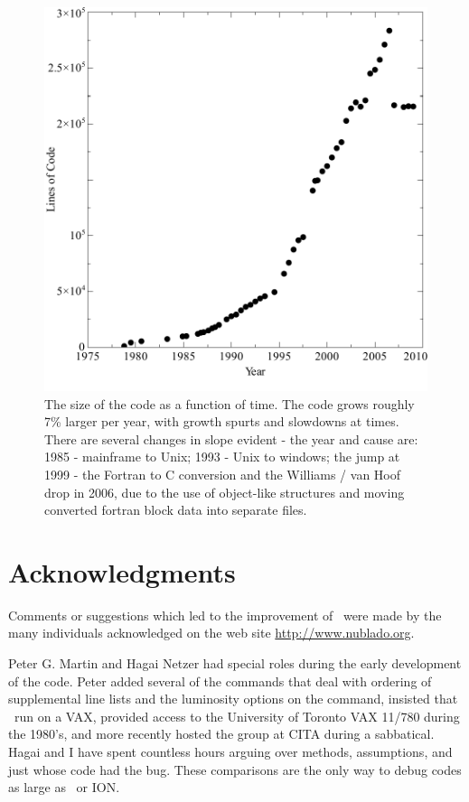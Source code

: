 \begin{figure}
\centering
\includegraphics{size}
\caption[\protect\Cloudy's size vs time]{\label{fig:size}The size of the code as a function of time. The code grows roughly
7\% larger per year, with growth spurts and slowdowns at times. There are
several changes in slope evident - the year and cause are: 1985 - mainframe
to Unix; 1993 - Unix to windows; the jump at 1999 - the Fortran to C
conversion and the Williams / van Hoof drop in 2006, due to the use of
object-like structures and moving converted fortran block data into separate
files.}
\end{figure}

\section{Acknowledgments}

Comments or suggestions which led to the improvement of \Cloudy\ were made
by the many individuals acknowledged on the web site
\href{http://www.nublado.org}{http://www.nublado.org}.

Peter G. Martin and Hagai Netzer had special roles during the early
development of the code.  Peter added several of the commands that deal
with ordering of supplemental line lists and the luminosity options on the
 command, insisted that \Cloudy\ run on a VAX, provided access to
the University of Toronto VAX 11/780 during the 1980's, and more recently
hosted the group at CITA during a sabbatical.  Hagai and I have spent
countless hours arguing over methods, assumptions, and just whose code had
the bug.  These comparisons are the only way to debug codes as large as
\Cloudy\ or ION.

